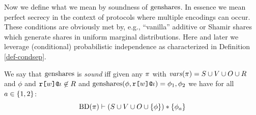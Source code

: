 Now we define what we mean by soundness of $\mathrm{genshares}$. In essence
we mean perfect secrecy \cite{barthe2019probabilistic} in the context
of protocols where multiple encodings can occur. These
conditions are obviously met by, e.g., ``vanilla'' additive or Shamir
shares which generate shares in uniform marginal distributions. Here
and later we leverage (conditional) probabilistic independence as
characterized in Definition
\ref{def-condsep}.
\begin{definition}
  \label{def-genshares}
  We say that $\mathrm{genshares}$ is \emph{sound} iff given any $\pi$ with
  $\mathit{vars}(\pi) = S \cup V \cup O \cup R$
  and $\phi$ and $\texttt{r[}w\texttt{]}\texttt{@}\iota \not \in R$ and $\mathrm{genshares}(\phi,\texttt{r[}w\texttt{]}\texttt{@}\iota) =
  \phi_1,\phi_2$ we have for all $a \in \{ 1,2 \}$:
  $$
  \mathrm{BD}(\pi) \vdash (S \cup V \cup O \cup \{ \phi \}) * \{ \phi_a \}
  $$
\end{definition} 

